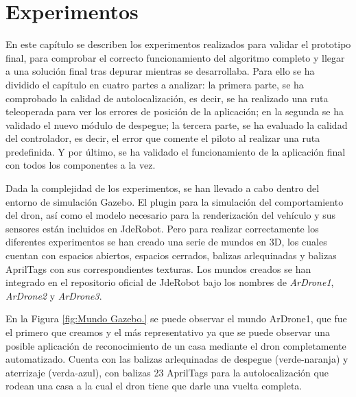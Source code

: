 \chapter{Experimentos}\label{cap.experimentos}
\hspace{1cm} En este capítulo se describen los experimentos realizados para validar el prototipo final, para comprobar el correcto funcionamiento del algoritmo completo y llegar a una solución final tras depurar mientras se desarrollaba. Para ello se ha dividido el capítulo en cuatro partes a analizar: la primera parte, se ha comprobado la calidad de autolocalización, es decir, se ha realizado una ruta teleoperada para ver los errores de posición de la aplicación; en la segunda se ha validado el
nuevo módulo de despegue; la tercera parte, se ha evaluado la calidad del controlador, es decir, el error que comente el piloto al realizar una ruta predefinida. Y por último, se ha validado el funcionamiento de la aplicación final con todos los componentes a la vez.

\hspace{1cm} Dada la complejidad de los experimentos, se han llevado a cabo dentro del entorno de simulación Gazebo. El plugin para la simulación del comportamiento del dron, así como el modelo necesario para la renderización del vehículo y sus sensores están incluidos en JdeRobot. Pero para realizar correctamente los diferentes experimentos se han creado una serie de mundos en 3D, los cuales cuentan con espacios abiertos, espacios cerrados, balizas arlequinadas y balizas AprilTags con sus correspondientes texturas. Los mundos creados se han integrado en el repositorio oficial de JdeRobot bajo los nombres de \textit{ArDrone1}, \textit{ArDrone2} y \textit{ArDrone3}.

\hspace{1cm} En la Figura \ref{fig:Mundo Gazebo.} se puede observar el mundo ArDrone1, que fue el primero que creamos y el más representativo ya que se puede observar una posible aplicación de reconocimiento de un casa mediante el dron completamente automatizado. Cuenta con las balizas arlequinadas de despegue (verde-naranja) y aterrizaje (verda-azul), con balizas 23 AprilTags para la autolocalización que rodean una casa a la cual el dron tiene que darle una vuelta completa.

